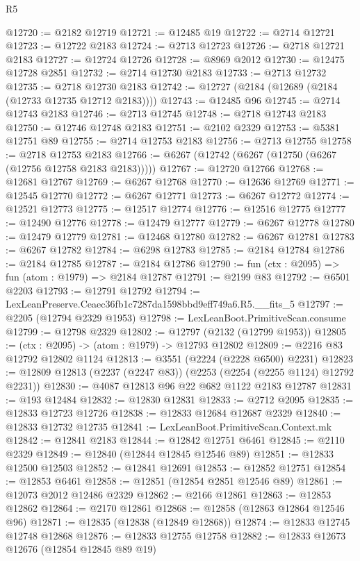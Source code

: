 \begin{lexlean}{R5}
\begin{coremodule}
@12720 := @2182 @12719
@12721 := @12485 @19
@12722 := @2714 @12721
@12723 := @12722 @2183
@12724 := @2713 @12723
@12726 := @2718 @12721 @2183
@12727 := @12724 @12726
@12728 := @8969 @2012
@12730 := @12475 @12728 @2851
@12732 := @2714 @12730 @2183
@12733 := @2713 @12732
@12735 := @2718 @12730 @2183
@12742 := @12727 (@2184 (@12689 (@2184 (@12733 @12735 @12712 @2183))))
@12743 := @12485 @96
@12745 := @2714 @12743 @2183
@12746 := @2713 @12745
@12748 := @2718 @12743 @2183
@12750 := @12746 @12748 @2183
@12751 := @2102 @2329
@12753 := @5381 @12751 @89
@12755 := @2714 @12753 @2183
@12756 := @2713 @12755
@12758 := @2718 @12753 @2183
@12766 := @6267 (@12742 (@6267 (@12750 (@6267 (@12756 @12758 @2183 @2183)))))
@12767 := @12720 @12766
@12768 := @12681 @12767
@12769 := @6267 @12768
@12770 := @12636 @12769
@12771 := @12545 @12770
@12772 := @6267 @12771
@12773 := @6267 @12772
@12774 := @12521 @12773
@12775 := @12517 @12774
@12776 := @12516 @12775
@12777 := @12490 @12776
@12778 := @12479 @12777
@12779 := @6267 @12778
@12780 := @12479 @12779
@12781 := @12468 @12780
@12782 := @6267 @12781
@12783 := @6267 @12782
@12784 := @6298 @12783
@12785 := @2184 @12784
@12786 := @2184 @12785
@12787 := @2184 @12786
@12790 := fun (ctx : @2095) => fun (atom : @1979) => @2184 @12787
@12791 := @2199 @83
@12792 := @6501 @2203
@12793 := @12791 @12792
@12794 := LexLeanPreserve.Ceaec36fb1c7287da1598bbd9eff749a6.R5.__fits_5
@12797 := @2205 (@12794 @2329 @1953)
@12798 := LexLeanBoot.PrimitiveScan.consume
@12799 := @12798 @2329
@12802 := @12797 (@2132 (@12799 @1953))
@12805 := (ctx : @2095) -> (atom : @1979) -> @12793 @12802
@12809 := @2216 @83 @12792 @12802 @1124
@12813 := @3551 (@2224 (@2228 @6500) @2231)
@12823 := @12809 @12813 (@2237 (@2247 @83)) (@2253 (@2254 (@2255 @1124) @12792 @2231))
@12830 := @4087 @12813 @96 @22 @682 @1122 @2183 @12787
@12831 := @193 @12484
@12832 := @12830 @12831
@12833 := @2712 @2095
@12835 := @12833 @12723 @12726
@12838 := @12833 @12684 @12687 @2329
@12840 := @12833 @12732 @12735
@12841 := LexLeanBoot.PrimitiveScan.Context.mk
@12842 := @12841 @2183
@12844 := @12842 @12751 @6461
@12845 := @2110 @2329
@12849 := @12840 (@12844 @12845 @12546 @89)
@12851 := @12833 @12500 @12503
@12852 := @12841 @12691
@12853 := @12852 @12751
@12854 := @12853 @6461
@12858 := @12851 (@12854 @2851 @12546 @89)
@12861 := @12073 @2012 @12486 @2329
@12862 := @2166 @12861
@12863 := @12853 @12862
@12864 := @2170 @12861
@12868 := @12858 (@12863 @12864 @12546 @96)
@12871 := @12835 (@12838 (@12849 @12868))
@12874 := @12833 @12745 @12748 @12868
@12876 := @12833 @12755 @12758
@12882 := @12833 @12673 @12676 (@12854 @12845 @89 @19)

\end{coremodule}
\end{lexlean}
